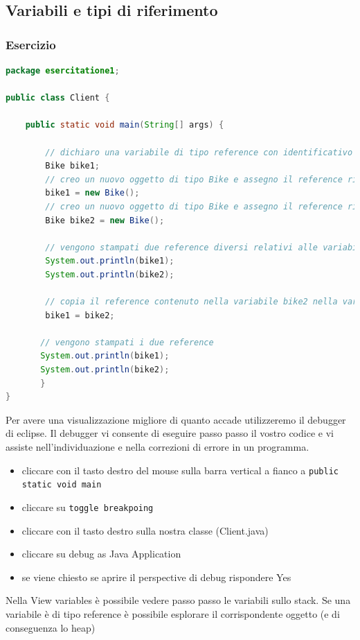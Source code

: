 \documentclass{article}
\theoremstyle{definition}
\begin{document}
\subsection{Variabili e tipi di riferimento}

\subsubsection{Esercizio}
\begin{lstlisting}[language=Java,escapechar=|]
package esercitatione1;

public class Client {

	public static void main(String[] args) {

        // dichiaro una variabile di tipo reference con identificativo bike1
        Bike bike1;
        // creo un nuovo oggetto di tipo Bike e assegno il reference ritornato alla variabile bike1
        bike1 = new Bike();
        // creo un nuovo oggetto di tipo Bike e assegno il reference ritornato alla variabile bike2
        Bike bike2 = new Bike();
        
        // vengono stampati due reference diversi relativi alle variabili bike1 e bike2
    	System.out.println(bike1);
    	System.out.println(bike2);
    	
    	// copia il reference contenuto nella variabile bike2 nella variabile bike1
    	bike1 = bike2;
    
       // vengono stampati i due reference
       System.out.println(bike1);
       System.out.println(bike2);	
       }
}
\end{lstlisting}
Per avere una visualizzazione migliore di quanto accade utilizzeremo il debugger di eclipse. Il debugger vi consente di eseguire passo passo il vostro codice e vi assiste nell'individuazione e nella correzioni di errore in un programma.

\begin{itemize}
\item cliccare con il tasto destro del mouse sulla barra vertical a fianco a \texttt{public static void main}
\item cliccare su \texttt{toggle breakpoing}
\item cliccare con il tasto destro sulla nostra classe (Client.java)
\item cliccare su debug as Java Application
\item se viene chiesto se aprire il perspective di debug rispondere Yes
\end{itemize}
Nella View variables \`e possibile vedere passo passo le variabili sullo stack. Se una variabile \`e di tipo reference \`e possibile esplorare il corrispondente oggetto (e di conseguenza lo heap)
\end{document}
